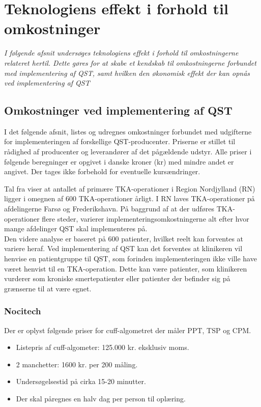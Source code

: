 \section{Teknologiens effekt i forhold til omkostninger} \label{priser}
\textit{I følgende afsnit undersøges teknologiens effekt i forhold til omkostningerne relateret hertil. Dette gøres for at skabe et kendskab til omkostningerne forbundet med implementering af QST, samt hvilken den økonomisk effekt der kan opnås ved implementering af QST}

\subsection{Omkostninger ved implementering af QST}
I det følgende afsnit, listes og udregnes omkostninger forbundet med udgifterne for implementeringen af forskellige QST-producenter. Priserne er stillet til rådighed af producenter og leverandører af det pågældende udstyr. Alle priser i følgende beregninger er opgivet i danske kroner (kr) med mindre andet er angivet. Der tages ikke forbehold for eventuelle kursændringer. 

Tal fra  viser at antallet af primære TKA-operationer i Region Nordjylland (RN) ligger i omegnen af 600 TKA-operationer årligt. \citep{aarsrapport2016} I RN laves TKA-operationer på afdelingerne Farsø og Frederikshavn. På baggrund af at der udføres TKA-operationer flere steder, varierer implementeringsomkostningerne alt efter hvor mange afdelinger QST skal implementeres på. \\
Den videre analyse er baseret på 600 patienter, hvilket reelt kan forventes at variere heraf. Ved implementering af QST kan det forventes at klinikeren vil henvise en patientgruppe til QST, som forinden implementeringen ikke ville have været henvist til en TKA-operation. Dette kan være patienter, som klinikeren vurderer som kroniske smertepatienter eller patienter der befinder sig på grænserne til at være egnet. 

\subsubsection{Nocitech}
Der er oplyst følgende priser for cuff-algometret der måler PPT, TSP og CPM.
\begin{itemize}  
\item Listepris af cuff-algometer: 125.000 kr. eksklusiv moms.
\item 2 manchetter: 1600 kr. per 200 måling.
\item Undersøgelsestid på cirka 15-20 minutter.
\item Der skal påregnes en halv dag per person til oplæring.
\end{itemize}

